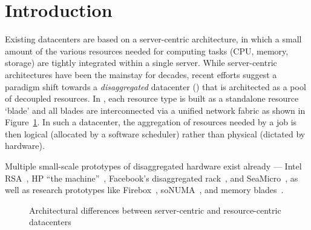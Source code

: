 \vspace{-0.1in}
\section{Introduction}
\vspace{-0.05in}
\label{sec:intro}
Existing datacenters are based on a server-centric architecture, in which a small amount of the various resources needed for computing tasks (CPU, memory, storage) are tightly integrated within a single server. While server-centric architectures have been the mainstay for decades, recent efforts suggest a paradigm shift towards a {\em disaggregated} datacenter (\dis) that is architected as a pool of decoupled resources. In \dis, each resource type is built as a standalone resource `blade' and all blades are interconnected via a unified network fabric as shown in Figure~\ref{fig:dc}. In such a datacenter, the aggregation of resources needed by a job is then logical (allocated by a software scheduler) rather than physical (dictated by hardware).

Multiple small-scale prototypes of disaggregated hardware exist already --- Intel RSA~\cite{rsa}, HP ``the machine''~\cite{hptm}, Facebook's disaggregated rack~\cite{fdr}, and SeaMicro~\cite{seamicro}, as well as research prototypes like Firebox~\cite{firebox}, soNUMA~\cite{sonuma}, and memory blades~\cite{ddcHwDesign1}.

\begin{figure}[!t]
\centering 
{}
\hfill
{}
\caption{Architectural differences between server-centric and resource-centric datacenters}
\label{fig:dc}
\end{figure}



